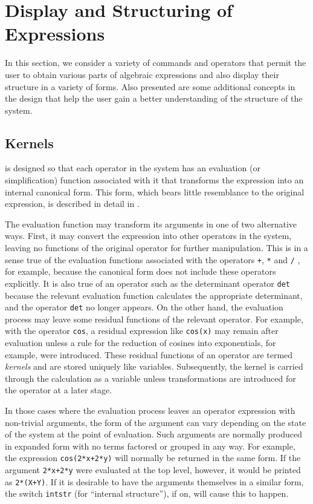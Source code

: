 \chapter{Display and Structuring of Expressions}
In this section, we consider a variety of commands and operators that
permit the user to obtain various parts of algebraic expressions and also
display their structure in a variety of forms. Also presented are some
additional concepts in the {\REDUCE} design that help the user gain a better
understanding of the structure of the system.

\section{Kernels}
\label{sec:kernel}
{\REDUCE} is designed so that each operator in the system has an
evaluation (or simplification) function associated
with it that transforms the expression into an internal canonical form.
  This form, which bears little resemblance to the
original expression, is described in detail in \cite{Hearn:71a}.

The evaluation function may transform its arguments in one of two
alternative ways.  First, it may convert the expression into other
operators in the system, leaving no functions of the original operator for
further manipulation.  This is in a sense true of the evaluation functions
associated with the operators \texttt{+}, \texttt{*} and \texttt{/} , for example,
because the canonical form does not include these
operators explicitly.  It is also true of an operator such as the
determinant operator \texttt{det} because the relevant
evaluation function calculates the appropriate determinant, and the
operator \texttt{det} no longer appears.  On the other hand, the evaluation
process may leave some residual functions of the relevant operator.  For
example, with the operator \texttt{cos}, a residual expression like
\texttt{cos(x)} may remain after evaluation unless a rule for the reduction of
cosines into exponentials, for example, were introduced.  These residual
functions of an operator are termed \emph{kernels} and are
stored uniquely like variables.  Subsequently, the kernel is carried
through the calculation as a variable unless transformations are
introduced for the operator at a later stage.

\hypertarget{switch:INTSTR}{}
In those cases where the evaluation process leaves an operator expression
with non-trivial arguments, the form of the argument can vary depending on
the state of the system at the point of evaluation.  Such arguments are
normally produced in expanded form with no terms factored or grouped in
any way.  For example, the expression \texttt{cos(2*x+2*y)} will normally be
returned in the same form.  If the argument \texttt{2*x+2*y} were evaluated
at the top level, however, it would be printed as \texttt{2*(X+Y)}.  If it is
desirable to have the arguments themselves in a similar form, the switch
\texttt{intstr} (for ``internal structure''), if on, will
cause this to happen.

